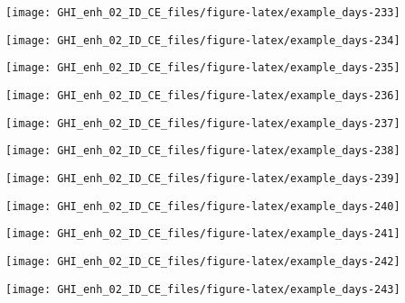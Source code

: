 \documentclass[
  10pt,
  a4paper,oneside]{article}
\begin{document}
\begin{center}\texttt{[image: GHI\_enh\_02\_ID\_CE\_files/figure-latex/example\_days-233]} \end{center}

\begin{center}\texttt{[image: GHI\_enh\_02\_ID\_CE\_files/figure-latex/example\_days-234]} \end{center}

\begin{center}\texttt{[image: GHI\_enh\_02\_ID\_CE\_files/figure-latex/example\_days-235]} \end{center}

\begin{center}\texttt{[image: GHI\_enh\_02\_ID\_CE\_files/figure-latex/example\_days-236]} \end{center}

\begin{center}\texttt{[image: GHI\_enh\_02\_ID\_CE\_files/figure-latex/example\_days-237]} \end{center}

\begin{center}\texttt{[image: GHI\_enh\_02\_ID\_CE\_files/figure-latex/example\_days-238]} \end{center}

\begin{center}\texttt{[image: GHI\_enh\_02\_ID\_CE\_files/figure-latex/example\_days-239]} \end{center}

\begin{center}\texttt{[image: GHI\_enh\_02\_ID\_CE\_files/figure-latex/example\_days-240]} \end{center}

\begin{center}\texttt{[image: GHI\_enh\_02\_ID\_CE\_files/figure-latex/example\_days-241]} \end{center}

\begin{center}\texttt{[image: GHI\_enh\_02\_ID\_CE\_files/figure-latex/example\_days-242]} \end{center}

\begin{center}\texttt{[image: GHI\_enh\_02\_ID\_CE\_files/figure-latex/example\_days-243]} \end{center}
\end{document}
